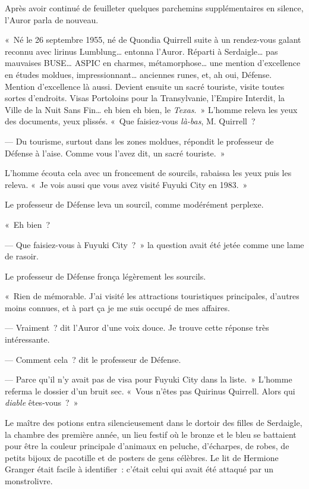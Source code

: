 Après avoir continué de feuilleter quelques parchemins supplémentaires en silence, l'Auror parla de nouveau.

«~Né le 26 septembre 1955, né de Quondia Quirrell suite à un rendez-vous galant reconnu avec lirinus Lumblung… entonna l'Auror.
Réparti à Serdaigle… pas mauvaises BUSE…
ASPIC en charmes, métamorphose… une mention d'excellence en études moldues, impressionnant… anciennes runes, et, ah oui, Défense.
Mention d'excellence là aussi.
Devient ensuite un sacré touriste, visite toutes sortes d'endroits.
Visas Portoloins pour la Transylvanie, l'Empire Interdit, la Ville de la Nuit Sans Fin… eh bien eh bien, le \emph{Texas}.~»
L'homme releva les yeux des documents, yeux plissés.
«~Que faisiez-vous \emph{là-bas}, M. Quirrell~?

--- Du tourisme, surtout dans les zones moldues, répondit le professeur de Défense à l'aise.
Comme vous l'avez dit, un sacré touriste.~»

L'homme écouta cela avec un froncement de sourcils, rabaissa les yeux puis les releva.
«~Je vois aussi que vous avez visité Fuyuki City en 1983.~»

Le professeur de Défense leva un sourcil, comme modérément perplexe.

«~Eh bien~?

--- Que faisiez-vous à Fuyuki City~?~»
la question avait été jetée comme une lame de rasoir.

Le professeur de Défense fronça légèrement les sourcils.

«~Rien de mémorable.
J'ai visité les attractions touristiques principales, d'autres moins connues, et à part ça je me suis occupé de mes affaires.

--- Vraiment~? dit l'Auror d'une voix douce.
Je trouve cette réponse très intéressante.

--- Comment cela~? dit le professeur de Défense.

--- Parce qu'il n'y avait pas de visa pour Fuyuki City dans la liste.~»
L'homme referma le dossier d'un bruit sec.
«~Vous n'êtes pas Quirinus Quirrell.
Alors qui \emph{diable} êtes-vous~?~»

\later

Le maître des potions entra silencieusement dans le dortoir des filles de Serdaigle, la chambre des première année, un lieu festif où le bronze et le bleu se battaient pour être la couleur principale d'animaux en peluche, d'écharpes, de robes, de petits bijoux de pacotille et de posters de gens célèbres.
Le lit de Hermione Granger était facile à identifier~: c'était celui qui avait été attaqué par un monstrolivre.

